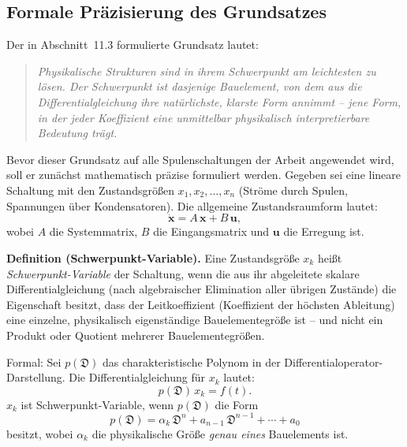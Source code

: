 ﻿\documentclass[12pt, a4paper]{article}
\begin{document}
	\subsection{Formale Präzisierung des Grundsatzes}
	
	Der in Abschnitt~11.3 formulierte Grundsatz lautet:
	
	\begin{quote}
		\textit{Physikalische Strukturen sind in ihrem Schwerpunkt am leichtesten zu lösen.
			Der Schwerpunkt ist dasjenige Bauelement, von dem aus die Differentialgleichung
			ihre natürlichste, klarste Form annimmt -- jene Form, in der jeder Koeffizient
			eine unmittelbar physikalisch interpretierbare Bedeutung trägt.}
	\end{quote}
	
	Bevor dieser Grundsatz auf alle Spulenschaltungen der Arbeit angewendet wird,
	soll er zunächst mathematisch präzise formuliert werden. Gegeben sei eine
	lineare Schaltung mit den Zustandsgrößen $x_1, x_2, \ldots, x_n$ (Ströme
	durch Spulen, Spannungen über Kondensatoren). Die allgemeine Zustandsraum\-form
	lautet:
	\begin{equation}
		\dot{\mathbf{x}} = A\,\mathbf{x} + B\,\mathbf{u},
		\label{eq:zustandsraum}
	\end{equation}
	wobei $A$ die Systemmatrix, $B$ die Eingangsmatrix und $\mathbf{u}$ die
	Erregung ist.
	
	\textbf{Definition (Schwerpunkt-Variable).}
	Eine Zustandsgröße $x_k$ heißt \textit{Schwerpunkt-Variable} der Schaltung,
	wenn die aus ihr abgeleitete skalare Differentialgleichung (nach algebraischer
	Elimination aller übrigen Zustände) die Eigenschaft besitzt, dass der
	Leitkoeffizient (Koeffizient der höchsten Ableitung) eine einzelne,
	physikalisch eigenständige Bauelementegröße ist -- und nicht ein Produkt oder
	Quotient mehrerer Bauelementegrößen.
	
	Formal: Sei $p(\mathfrak{D})$ das charakteristische Polynom in der
	Differentialoperator-Darstellung. Die Differentialgleichung für $x_k$ lautet:
	\begin{equation}
		p(\mathfrak{D})\,x_k = f(t).
	\end{equation}
	$x_k$ ist Schwerpunkt-Variable, wenn $p(\mathfrak{D})$ die Form
	\begin{equation}
		p(\mathfrak{D}) = \alpha_k\,\mathfrak{D}^n + a_{n-1}\,\mathfrak{D}^{n-1}
		+ \cdots + a_0
	\end{equation}
	besitzt, wobei $\alpha_k$ die physikalische Größe \emph{genau eines} Bauelements ist.
	
\end{document}
